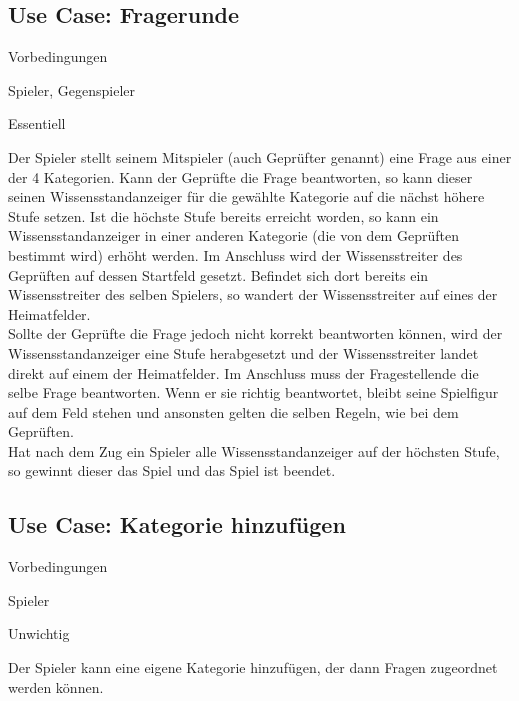 \subsection{Use Case: Fragerunde}
\begin{labeling}[:]{Vorbedingungen}
\item [Akteure] Spieler, Gegenspieler
\item [Priorität] Essentiell
\item [Beschreibung] Der Spieler stellt seinem Mitspieler (auch Geprüfter genannt) eine Frage aus einer der 4 Kategorien. Kann der Geprüfte die Frage beantworten, so kann dieser seinen Wissensstandanzeiger für die gewählte Kategorie auf die nächst höhere Stufe setzen. Ist die höchste Stufe bereits erreicht worden, so kann ein Wissensstandanzeiger in einer anderen Kategorie (die von dem Geprüften bestimmt wird) erhöht werden. Im Anschluss wird der Wissensstreiter des Geprüften auf dessen Startfeld gesetzt. Befindet sich dort bereits ein Wissensstreiter des selben Spielers, so wandert der Wissensstreiter auf eines der Heimatfelder.
\\
Sollte der Geprüfte die Frage jedoch nicht korrekt beantworten können, wird der Wissensstandanzeiger eine Stufe herabgesetzt und der Wissensstreiter landet direkt auf einem der Heimatfelder. Im Anschluss muss der Fragestellende die selbe Frage beantworten. Wenn er sie richtig beantwortet, bleibt seine Spielfigur auf dem Feld stehen und ansonsten gelten die selben Regeln, wie bei dem Geprüften. \\

Hat nach dem Zug ein Spieler alle Wissensstandanzeiger auf der höchsten Stufe, so gewinnt dieser das Spiel und das Spiel ist beendet.
\item [Vorbedingungen]
\item [Offene Punkte]
\end{labeling}

\newpage{}
\subsection{Use Case: Kategorie hinzufügen}
\begin{labeling}[:]{Vorbedingungen}
\item [Akteure] Spieler
\item [Priorität] Unwichtig
\item [Beschreibung] Der Spieler kann eine eigene Kategorie hinzufügen, der dann Fragen zugeordnet werden können.
\item [Vorbedingungen]
\item [Offene Punkte]
\end{labeling}

